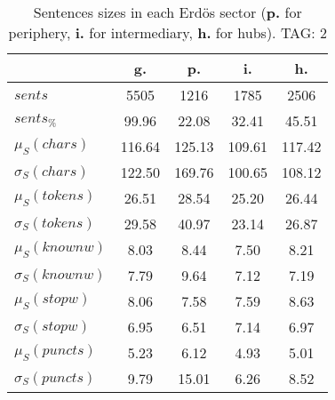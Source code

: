 \begin{table}[h!]
\begin{center}
\begin{tabular}{| l | c | c | c | c |}\hline
 & g. & p. & i. & h. \\\hline
$sents$ & 5505  & 1216  & 1785  & 2506 \\\hline
$sents_{\%}$ & 99.96  & 22.08  & 32.41  & 45.51 \\\hline
$\mu_S(chars)$ & 116.64  & 125.13  & 109.61  & 117.42 \\\hline
$\sigma_S(chars)$ & 122.50  & 169.76  & 100.65  & 108.12 \\\hline
$\mu_S(tokens)$ & 26.51  & 28.54  & 25.20  & 26.44 \\\hline
$\sigma_S(tokens)$ & 29.58  & 40.97  & 23.14  & 26.87 \\\hline
$\mu_S(knownw)$ & 8.03  & 8.44  & 7.50  & 8.21 \\\hline
$\sigma_S(knownw)$ & 7.79  & 9.64  & 7.12  & 7.19 \\\hline
$\mu_S(stopw)$ & 8.06  & 7.58  & 7.59  & 8.63 \\\hline
$\sigma_S(stopw)$ & 6.95  & 6.51  & 7.14  & 6.97 \\\hline
$\mu_S(puncts)$ & 5.23  & 6.12  & 4.93  & 5.01 \\\hline
$\sigma_S(puncts)$ & 9.79  & 15.01  & 6.26  & 8.52 \\\hline
\end{tabular}
\caption{Sentences sizes in each Erd\"os sector ({{\bf p.}} for periphery, {{\bf i.}} for intermediary, {{\bf h.}} for hubs). TAG: 2}
\end{center}
\end{table}